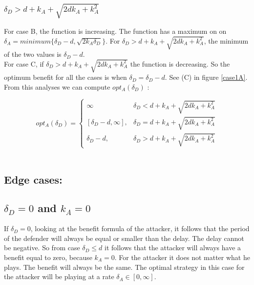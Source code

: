 \subsubsection*{$\delta_{D} > d+k_{A} + \sqrt{2dk_{A}+k_{A}^{2}}$} 
For case B, the function is increasing. The function has a maximum on on $\delta_{A} = minimum \{\delta_{D} -d, \sqrt{2k_{A}\delta_{D}} \} $. For $\delta_{D} > d+k_{A} + \sqrt{2dk_{A}+k_{A}^{2}}$, the minimum of the two values is $\delta_{D}-d$.\\
For case C, if $\delta_{D} > d+k_{A} + \sqrt{2dk_{A}+k_{A}^{2}}$ the function is decreasing. So the optimum benefit for all the cases is when $\delta_{D} = \delta_{D}-d$. See (C) in figure \ref{case1A}.\\


From this analyses we can compute $opt_{A}(\delta_{D})$ : 

 \begin{displaymath}
  opt_{A}(\delta_{D}) = \left\{
     \begin{array}{lr}
            \infty & \delta_{D} < d+k_{A} + \sqrt{2dk_{A}+k_{A}^{2}} \\
       \left[ \delta_{D}-d, \infty\right],  & \delta_{D} = d+k_{A} + \sqrt{2dk_{A}+k_{A}^{2}} \\
    	\delta_{D}-d, & \delta_{D} > d+k_{A} + \sqrt{2dk_{A}+k_{A}^{2}}
     \end{array}
   \right.
\end{displaymath}
\\

\subsection*{Edge cases:}

\subsection*{$\delta_{D}=0$ and $k_{A}=0$}
If $\delta_{D}=0$, looking at the benefit formula of the attacker, it follows that the period of the defender will always be equal or smaller than the delay. The delay cannot be negative. So from case $\delta_{D} \leq d$ it follows that the attacker will always have a benefit equal to zero, because $k_{A}=0$. For the attacker it does not matter what he plays. The benefit will always be the same. The optimal strategy in this case for the attacker will be playing at a rate $\delta_{A} \in [0,\infty ]$.

